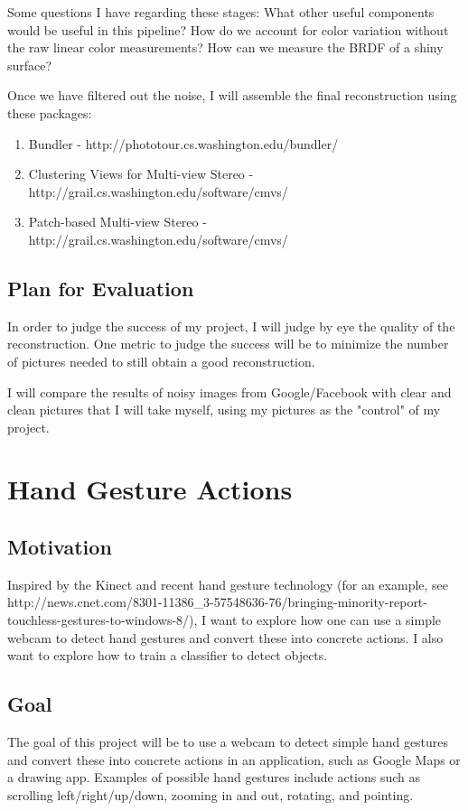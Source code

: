 \documentclass[12pt]{article}
\begin{document}
Some questions I have regarding these stages: What other useful components would be useful in this pipeline? How do we account for color variation without the raw linear color measurements? How can we measure the BRDF of a shiny surface?

Once we have filtered out the noise, I will assemble the final reconstruction using these packages:
\begin{enumerate}
\item Bundler - http://phototour.cs.washington.edu/bundler/
\item Clustering Views for Multi-view Stereo - http://grail.cs.washington.edu/software/cmvs/
\item Patch-based Multi-view Stereo - http://grail.cs.washington.edu/software/cmvs/
\end{enumerate}

\subsection{Plan for Evaluation}
In order to judge the success of my project, I will judge by eye the quality of the reconstruction. One metric to judge the success will be to minimize the number of pictures needed to still obtain a good reconstruction.

I will compare the results of noisy images from Google/Facebook with clear and clean pictures that I will take myself, using my pictures as the "control" of my project.

\section{Hand Gesture Actions}

\subsection{Motivation}
Inspired by the Kinect and recent hand gesture technology (for an example, see http://news.cnet.com/8301-11386\_3-57548636-76/bringing-minority-report-touchless-gestures-to-windows-8/), I want to explore how one can use a simple webcam to detect hand gestures and convert these into concrete actions. I also want to explore how to train a classifier to detect objects.

\subsection{Goal}
The goal of this project will be to use a webcam to detect simple hand gestures and convert these into concrete actions in an application, such as Google Maps or a drawing app. Examples of possible hand gestures include actions such as scrolling left/right/up/down, zooming in and out, rotating, and pointing. 
\end{document}
